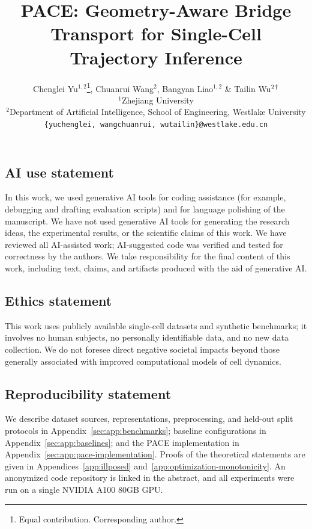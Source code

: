\documentclass{article} %
\title{PACE: Geometry-Aware Bridge Transport for Single-Cell Trajectory Inference}
\author{Chenglei Yu$^{1,2}$\thanks{Equal contribution. \quad \textdagger Corresponding author.}, Chuanrui Wang$^{2}$\footnotemark[1], Bangyan Liao$^{1,2}$ \& Tailin Wu$^{2}\textsuperscript{\textdagger}$  \\
$^{1}$Zhejiang University\\
$^{2}$Department of Artificial Intelligence, School of Engineering, Westlake University\\
\texttt{\{yuchenglei, wangchuanrui, wutailin\}@westlake.edu.cn} \\
}
\theoremstyle{plain}
\theoremstyle{definition}
\begin{document}
\newcommand{\model}{PACE}

\maketitle









\subsection*{AI use statement}
In this work, we used generative AI tools for coding assistance (for example,
debugging and drafting evaluation scripts) and for language polishing of the
manuscript. We have not used generative AI tools for generating the research
ideas, the experimental results, or the scientific claims of this work. We
have reviewed all AI-assisted work; AI-suggested code was verified and tested
for correctness by the authors. We take responsibility for the final content
of this work, including text, claims, and artifacts produced with the aid of
generative AI.

\subsection*{Ethics statement}
This work uses publicly available single-cell datasets and synthetic
benchmarks; it involves no human subjects, no personally identifiable data,
and no new data collection. We do not foresee direct negative societal impacts
beyond those generally associated with improved computational models of cell
dynamics.

\subsection*{Reproducibility statement}
We describe dataset sources, representations, preprocessing, and held-out
split protocols in Appendix~\ref{sec:app:benchmarks}; baseline configurations
in Appendix~\ref{sec:app:baselines}; and the PACE implementation in
Appendix~\ref{sec:app:pace-implementation}. Proofs of the theoretical
statements are given in Appendices~\ref{app:illposed}
and~\ref{app:optimization-monotonicity}. An anonymized code repository is
linked in the abstract, and all experiments were run on a single NVIDIA A100
80GB GPU.
\end{document}
